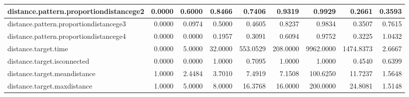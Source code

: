 \begin{table}[H]
{\begin{tabular}{|l|r|r|r|r|r|r|r|r|}
		distance.pattern.proportiondistancege2  & 0.0000                            & 0.6000                                & 0.8466                            & 0.7406                             & 0.9319                                & 0.9929                            & 0.2661                           & 0.3593                                   \\ \hline
		distance.pattern.proportiondistancege3  & 0.0000                            & 0.0974                                & 0.5000                            & 0.4605                             & 0.8237                                & 0.9834                            & 0.3507                           & 0.7615                                   \\ \hline
		distance.pattern.proportiondistancege4  & 0.0000                            & 0.0000                                & 0.1957                            & 0.3091                             & 0.6094                                & 0.9752                            & 0.3225                           & 1.0432                                   \\ \hline
		distance.target.time                    & 0.0000                            & 5.0000                                & 32.0000                           & 553.0529                           & 208.0000                              & 9962.0000                         & 1474.8373                        & 2.6667                                   \\ \hline
		distance.target.isconnected             & 0.0000                            & 0.0000                                & 1.0000                            & 0.7095                             & 1.0000                                & 1.0000                            & 0.4540                           & 0.6399                                   \\ \hline
		distance.target.meandistance            & 1.0000                            & 2.4484                                & 3.7010                            & 7.4919                             & 7.1508                                & 100.6250                          & 11.7237                          & 1.5648                                   \\ \hline
		distance.target.maxdistance             & 1.0000                            & 5.0000                                & 8.0000                            & 16.3768                            & 16.0000                               & 200.0000                          & 24.8081                          & 1.5148                                   \\ \hline

\end{tabular}}
\end{table}
